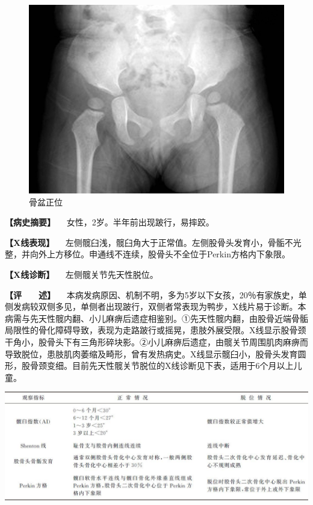 \begin{figure}[!htbp]
 \centering
 \includegraphics{./images/Image00020.jpg}
 \captionsetup{justification=centering}
 \caption{骨盆正位}
 \label{fig2-2-4}
  \end{figure} 

\textbf{【病史摘要】} 　女性，2岁。半年前出现跛行，易摔跤。

\textbf{【X线表现】}
　左侧髋臼浅，髋臼角大于正常值。左侧股骨头发育小，骨骺不光整，并向外上方移位。申通线不连续，股骨头不全位于Perkin方格内下象限。

\textbf{【X线诊断】} 　左侧髋关节先天性脱位。

\textbf{【评　　述】}
　本病发病原因、机制不明，多为5岁以下女孩，20％有家族史，单侧发病较双侧多见，单侧者出现跛行，双侧者常表现为鸭步，X线片易于诊断。本病需与先天性髋内翻、小儿麻痹后遗症相鉴别。①先天性髋内翻，由股骨近端骨骺局限性的骨化障碍导致，表现为走路跛行或摇晃，患肢外展受限。X线显示股骨颈干角小，股骨头下有三角形碎块影。②小儿麻痹后遗症，由髋关节周围肌肉麻痹而导致脱位，患肢肌肉萎缩及畸形，曾有发热病史。X线显示髋臼小，股骨头发育圆形，股骨颈变细。目前先天性髋关节脱位的X线诊断见下表，适用于6个月以上儿童。

\begin{center}
\includegraphics{./images/Image00021.jpg}
\end{center}

